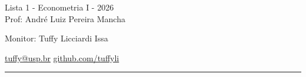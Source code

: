 \documentclass[12pt,letterpaper, onecolumn]{exam}
\begin{document}
\begingroup  
    \centering
    \LARGE Lista 1 - Econometria I - 2026\\[0.5em]
    \large Prof: André Luiz Pereira Mancha \par
    \large Monitor: Tuffy Licciardi Issa  \par
   \small \href{mailto:tuffy@usp.br}{tuffy@usp.br} \quad
\href{https://github.com/Tuffyli}{github.com/tuffyli} \par
\endgroup
\rule{\textwidth}{0.4pt}
\pointsdroppedatright   %
\printanswers


\begin{questions}


\end{questions}
\end{document}
